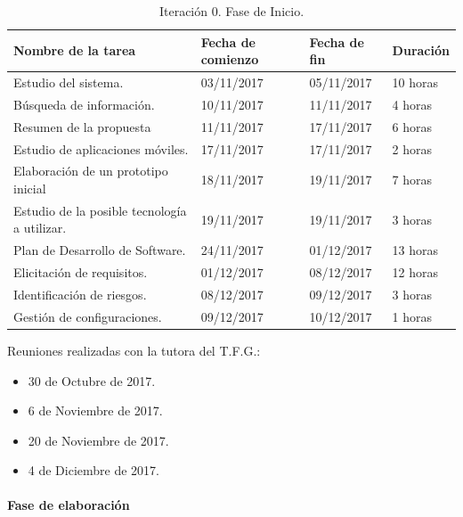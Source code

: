 \documentclass[twoside]{report}
\begin{document}
\begin{table}[H]
\centering
	\begin{tabular}{|l|l|l|l|}
    \hline
    Nombre de la tarea                           & Fecha de comienzo & Fecha de fin & Duración \\ \hline
    Estudio del sistema.                         & 03/11/2017        & 05/11/2017   & 10 horas  \\ \hline
    Búsqueda de información.                     & 10/11/2017        & 11/11/2017   & 4 horas   \\ \hline
    Resumen de la propuesta                      & 11/11/2017        & 17/11/2017   & 6 horas   \\ \hline
    Estudio de aplicaciones móviles.             & 17/11/2017        & 17/11/2017   & 2 horas   \\ \hline
    Elaboración de un prototipo inicial          & 18/11/2017        & 19/11/2017   & 7 horas   \\ \hline
    Estudio de la posible tecnología a utilizar. & 19/11/2017        & 19/11/2017   & 3 horas   \\ \hline
    Plan de Desarrollo de Software.              & 24/11/2017        & 01/12/2017   & 13 horas   \\ \hline
    Elicitación de requisitos.                   & 01/12/2017        & 08/12/2017   & 12 horas   \\ \hline
    Identificación de riesgos.                   & 08/12/2017        & 09/12/2017   & 3 horas   \\ \hline
    Gestión de configuraciones.                  & 09/12/2017        & 10/12/2017   & 1 horas   \\ \hline
    \end{tabular}
    \caption{Iteración 0. Fase de Inicio.}
\end{table}

Reuniones realizadas con la tutora del T.F.G.:

\begin{itemize}
\item 30 de Octubre de 2017.
\item 6 de Noviembre de 2017.
\item 20 de Noviembre de 2017.
\item 4 de Diciembre de 2017.
\end{itemize}

\paragraph{Fase de elaboración}\mbox{}\\
\end{document}
